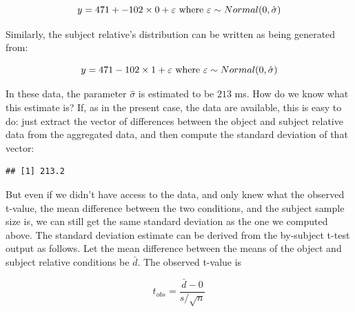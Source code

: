 \documentclass[
  12pt,
]{krantz}
\newenvironment{Shaded}{\begin{snugshade}}{\end{snugshade}}
\newcommand{\FunctionTok}[1]{\textcolor[rgb]{0.00,0.00,0.00}{#1}}
\newcommand{\NormalTok}[1]{#1}
\newcommand{\OtherTok}[1]{\textcolor[rgb]{0.56,0.35,0.01}{#1}}
\newcommand{\SpecialCharTok}[1]{\textcolor[rgb]{0.00,0.00,0.00}{#1}}
\newcommand{\StringTok}[1]{\textcolor[rgb]{0.31,0.60,0.02}{#1}}
\theoremstyle{definition}
\theoremstyle{definition}
\theoremstyle{definition}
\theoremstyle{definition}
\theoremstyle{remark}
\begin{document}
\begin{equation}
y = 471 + -102 \times 0 + \varepsilon \hfill \hbox{ where } \varepsilon \sim Normal(0,\hat\sigma)
\end{equation}

Similarly, the subject relative's distribution can be written as being generated from:

\begin{equation}
y = 471 - 102 \times 1 + \varepsilon \hbox{ where } \varepsilon \sim Normal(0,\hat\sigma)
\end{equation}

In these data, the parameter \(\hat\sigma\) is estimated to be \(213\) ms. How do we know what this estimate is? If, as in the present case, the data are available, this is easy to do: just extract the vector of differences between the object and subject relative data from the aggregated data, and then compute the standard deviation of that vector:

\begin{Shaded}
\end{Shaded}

\begin{verbatim}
## [1] 213.2
\end{verbatim}

But even if we didn't have access to the data, and only knew what the observed t-value, the mean difference between the two conditions, and the subject sample size is, we can still get the same standard deviation as the one we computed above. The standard deviation estimate can be derived from the by-subject t-test output as follows. Let the mean difference between the means of the object and subject relative conditions be \(\bar{d}\). The observed t-value is

\begin{equation}
t_{obs}= \frac{\bar{d}-0}{s/\sqrt{n}} 
\end{equation}
\end{document}
